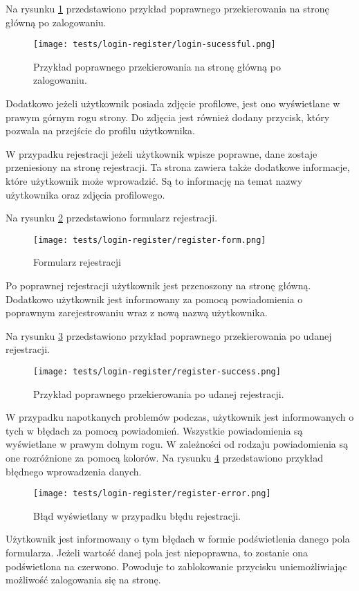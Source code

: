 Na rysunku \ref{login_success} przedstawiono przykład poprawnego przekierowania na stronę główną po zalogowaniu. 
\begin{figure}[H]
  \centering
  \texttt{[image: tests/login-register/login-sucessful.png]}
  \caption{Przykład poprawnego przekierowania na stronę główną po zalogowaniu.}
  \label{login_success}
\end{figure}
Dodatkowo jeżeli użytkownik posiada zdjęcie profilowe, jest ono wyświetlane w prawym górnym rogu strony. Do zdjęcia jest również dodany przycisk, który pozwala na przejście do profilu użytkownika.

W przypadku rejestracji jeżeli użytkownik wpisze poprawne, dane zostaje przeniesiony na stronę rejestracji. Ta strona zawiera także dodatkowe informacje, które użytkownik może wprowadzić. Są to informację na temat nazwy użytkownika oraz zdjęcia profilowego.

Na rysunku \ref{register_page} przedstawiono formularz rejestracji.
\begin{figure}[H]
  \centering
  \texttt{[image: tests/login-register/register-form.png]}
  \caption{Formularz rejestracji}
  \label{register_page}
\end{figure}
Po poprawnej rejestracji użytkownik jest przenoszony na stronę główną. Dodatkowo użytkownik jest informowany za pomocą powiadomienia o poprawnym zarejestrowaniu wraz z nową nazwą użytkownika. 

Na rysunku \ref{success_register} przedstawiono przykład poprawnego przekierowania po udanej rejestracji.
\begin{figure}[H]
  \centering
  \texttt{[image: tests/login-register/register-success.png]}
  \caption{Przykład poprawnego przekierowania po udanej rejestracji.}
  \label{success_register}
\end{figure}
W przypadku napotkanych problemów podczas, użytkownik jest informowanych o tych w błędach za pomocą powiadomień. Wszystkie powiadomienia są wyświetlane w prawym dolnym rogu. W zależności od rodzaju powiadomienia są one rozróżnione za pomocą kolorów. Na rysunku \ref{register_error} przedstawiono przykład błędnego wprowadzenia danych.
\begin{figure}[H]
  \centering
  \texttt{[image: tests/login-register/register-error.png]}
  \caption{Błąd wyświetlany w przypadku błędu rejestracji.}
  \label{register_error}
\end{figure}
Użytkownik jest informowany o tym błędach w formie podświetlenia danego pola formularza. Jeżeli wartość danej pola jest niepoprawna, to zostanie ona podświetlona na czerwono. Powoduje to zablokowanie przycisku uniemożliwiając możliwość zalogowania się na stronę.

